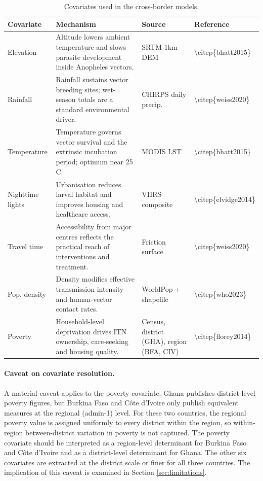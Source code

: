 \documentclass{article}
\begin{document}
\begin{longtable}[t]{l>{\raggedright\arraybackslash}p{5.5cm}ll}
\caption{\label{tab:covariates}Covariates used in the cross-border models. \label{tab:covariates}}\\
\toprule
Covariate & Mechanism & Source & Reference\\
\midrule
Elevation & Altitude lowers ambient temperature and slows parasite development inside Anopheles vectors. & SRTM 1km DEM & \textbackslash{}citep\{bhatt2015\}\\
Rainfall & Rainfall sustains vector breeding sites; wet-season totals are a standard environmental driver. & CHIRPS daily precip. & \textbackslash{}citep\{weiss2020\}\\
Temperature & Temperature governs vector survival and the extrinsic incubation period; optimum near 25 C. & MODIS LST & \textbackslash{}citep\{bhatt2015\}\\
Nighttime lights & Urbanisation reduces larval habitat and improves housing and healthcare access. & VIIRS composite & \textbackslash{}citep\{elvidge2014\}\\
Travel time & Accessibility from major centres reflects the practical reach of interventions and treatment. & Friction surface & \textbackslash{}citep\{weiss2020\}\\
\addlinespace
Pop. density & Density modifies effective transmission intensity and human-vector contact rates. & WorldPop + shapefile & \textbackslash{}citep\{who2023\}\\
Poverty & Household-level deprivation drives ITN ownership, care-seeking and housing quality. & Census, district (GHA), region (BFA, CIV) & \textbackslash{}citep\{florey2014\}\\
\bottomrule
\end{longtable}
\endgroup{}

\paragraph{Caveat on covariate resolution.}

A material caveat applies to the poverty covariate. Ghana publishes
district-level poverty figures, but Burkina Faso and Côte d'Ivoire only
publish equivalent measures at the regional (admin-1) level. For these
two countries, the regional poverty value is assigned uniformly to every
district within the region, so within-region between-district variation
in poverty is not captured. The poverty covariate should be interpreted
as a region-level determinant for Burkina Faso and Côte d'Ivoire and as
a district-level determinant for Ghana. The other six covariates are
extracted at the district scale or finer for all three countries. The
implication of this caveat is examined in Section \ref{sec:limitations}.
\end{document}
